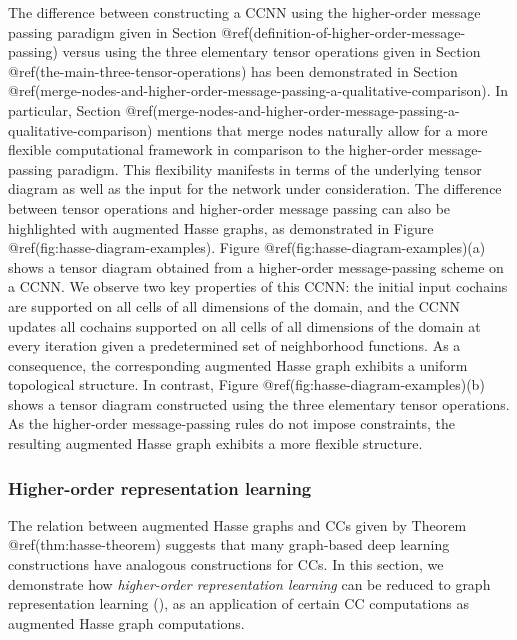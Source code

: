 \documentclass[
  12pt,
]{krantz}
\begin{document}
The difference between constructing a CCNN using the higher-order
message passing paradigm given in Section
@ref(definition-of-higher-order-message-passing) versus using the three
elementary tensor operations given in Section
@ref(the-main-three-tensor-operations) has been demonstrated in Section
@ref(merge-nodes-and-higher-order-message-passing-a-qualitative-comparison).
In particular, Section
@ref(merge-nodes-and-higher-order-message-passing-a-qualitative-comparison)
mentions that merge nodes naturally allow for a more flexible
computational framework in comparison to the higher-order
message-passing paradigm. This flexibility manifests in terms of the
underlying tensor diagram as well as the input for the network under
consideration. The difference between tensor operations and higher-order
message passing can also be highlighted with augmented Hasse graphs, as
demonstrated in Figure @ref(fig:hasse-diagram-examples). Figure
@ref(fig:hasse-diagram-examples)(a) shows a tensor diagram obtained from
a higher-order message-passing scheme on a CCNN. We observe two key
properties of this CCNN: the initial input cochains are supported on all
cells of all dimensions of the domain, and the CCNN updates all cochains
supported on all cells of all dimensions of the domain at every
iteration given a predetermined set of neighborhood functions. As a
consequence, the corresponding augmented Hasse graph exhibits a uniform
topological structure. In contrast, Figure
@ref(fig:hasse-diagram-examples)(b) shows a tensor diagram constructed
using the three elementary tensor operations. As the higher-order
message-passing rules do not impose constraints, the resulting augmented
Hasse graph exhibits a more flexible structure.

\subsubsection{Higher-order representation
learning}\label{higher-order-representation-learning}

The relation between augmented Hasse graphs and CCs given by Theorem
@ref(thm:hasse-theorem) suggests that many graph-based deep learning
constructions have analogous constructions for CCs. In this section, we
demonstrate how \emph{higher-order representation learning} can be
reduced to graph representation learning
(), as an application of certain CC computations as augmented Hasse
graph computations.
\end{document}
